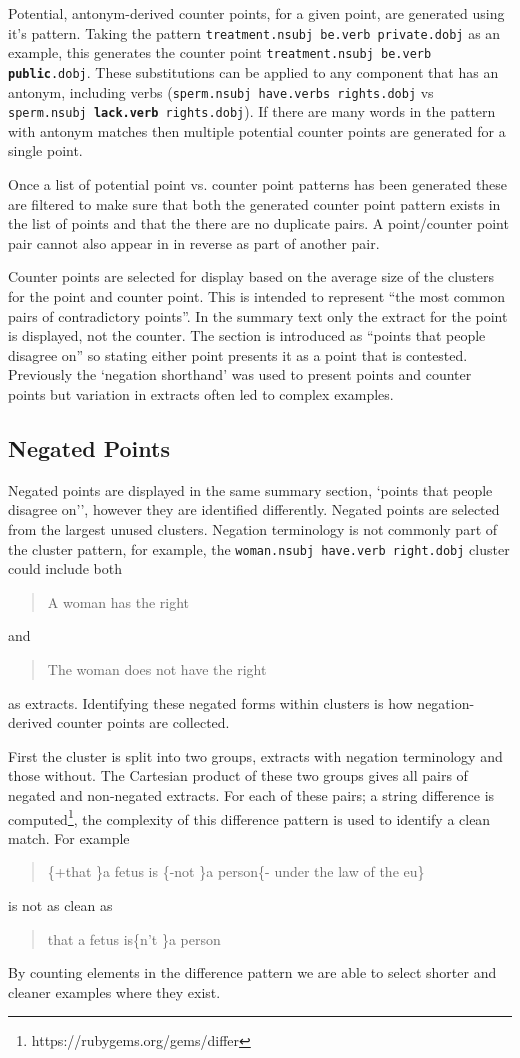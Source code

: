       Potential, antonym-derived counter points, for a given point, are generated using it's pattern. Taking the pattern \texttt{treatment.nsubj be.verb private.dobj} as an example, this generates the counter point \texttt{treatment.nsubj be.verb \textbf{public}.dobj}. These substitutions can be applied to any component that has an antonym, including verbs (\texttt{sperm.nsubj have.verbs rights.dobj} vs \texttt{sperm.nsubj \textbf{lack.verb} rights.dobj}). If there are many words in the pattern with antonym matches then multiple potential counter points are generated for a single point.

      Once a list of potential point vs. counter point patterns has been generated these are filtered to make sure that both the generated counter point pattern exists in the list of points and that the there are no duplicate pairs. A point/counter point pair cannot also appear in in reverse as part of another pair.

      Counter points are selected for display based on the average size of the clusters for the point and counter point. This is intended to represent ``the most common pairs of contradictory points''. In the summary text only the extract for the point is displayed, not the counter. The section is introduced as ``points that people disagree on'' so stating either point presents it as a point that is contested. Previously the `negation shorthand' was used to present points and counter points but variation in extracts often led to complex examples.

    \subsection{Negated Points}
      Negated points are displayed in the same summary section, `points that people disagree on'', however they are identified differently. Negated points are selected from the largest unused clusters. Negation terminology is not commonly part of the cluster pattern, for example, the \texttt{woman.nsubj have.verb right.dobj} cluster could include both \blockquote{A woman has the right} and \blockquote{The woman does not have the right} as extracts. Identifying these negated forms within clusters is how negation-derived counter points are collected.

      First the cluster is split into two groups, extracts with negation terminology and those without. The Cartesian product of these two groups gives all pairs of negated and non-negated extracts. For each of these pairs; a string difference is computed\footnote{https://rubygems.org/gems/differ}, the complexity of this difference pattern is used to identify a clean match. For example \blockquote{\{+that \}a fetus is \{-not \}a person\{- under the law of the eu\}} is not as clean as \blockquote{that a fetus is\{n't \}a person}. By counting elements in the difference pattern we are able to select shorter and cleaner examples where they exist.

